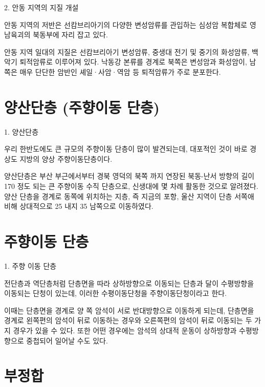 \documentclass[12pt, a4paper, oneside]{book}
\begin{document}
2. 		안동 지역의 지질 개설

안동 지역의 저반은 선캄브리아기의 다양한 변성암류를 관입하는 심성암 복합체로 영남육괴의 북동부에 자리 잡고 있다. 

안동 지역 일대의 지질은 선캄브리아기 변성암류, 중생대 전기 및 중기의 화성암류, 백악기 퇴적암류로 이루어져 있다. 낙동강 본류를 경계로 북쪽은 변성암과 화성암이, 남쪽은 매우 단단한 암반인 셰일·사암·역암 등 퇴적암류가 주로 분포한다.



	\newpage  \null
	\section{양산단층 (주향이동 단층)}




1. 		양산단층

우리 한반도에도 큰 규모의 주향이동 단층이 많이 발견되는데, 대포적인 것이 바로 경상도 지방의 양상 주향이동단층이다. 

양산단층은 부산 부근에서부터 경북 영덕의 북쪽 까지 연장된 북동-난서 방향의 길이 170 정도 되는 큰 주향이동 수직 단층으로, 신생대에 몇 차례 활동한 것으로 알려졌다. 양산 단층을 경계로 동쪽에 위치하는 지층, 즉 지금의 포항, 울산 지역이 단층 서쪽애 비해 상대적으로 25 내지 35  남쪽으로 이동하였다.




	\newpage  \null
	\section{주향이동 단층}




1. 		주향 이동 단층

전단층과 역단층처럼 단층면을 따라 상하방향으로 이동되는 단층과 달이 수평방향을 이동되는 단청이 있는데, 이러한 수평이동단청을 주향이동단청이라고 한다. 

이때는 단층면을 경계로 양 쪽 암석이 서로 반대방향으로 이동하게 되는데, 단층면을 경계로 왼쪽편의 암석이 뒤로 이동하는 경우와 오른쪽편의 암석이 뒤로 이동되는 두 가지 경우가 있을 수 있다. 또한 어떤 경우에는 암석의 상대적 운동이 상하방향과 수평방향으로 중첩되어 일어날 수도 있다.




	\newpage  \null
	\section{부정합}
\end{document}
